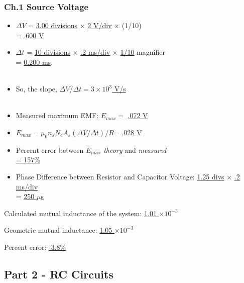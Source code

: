 \documentclass[twocolumn,english]{IEEEtran}
\theoremstyle{plain}
\theoremstyle{plain}
\begin{document}
\subsubsection{Ch.1 Source Voltage}
\begin{itemize}
\item $\Delta V$ = \underline{3.00 divisions}  $\times$ \underline{2 V/div} $\times$ (1/10)
\\ \hfill= \underline{.600 V}

\item $\Delta t$ = \underline{10 divisions} $\times$ \underline{.2 ms/div}  $\times$ \underline{1/10} magnifier \\ \hfill= \underline{0.200 ms}. \\ \\

\item So, the slope, \hfill$\Delta V/\Delta t = $\underline{$3 \times 10^3$ V/s} \\ \\


\noindent\hrulefill

\item Measured maximum EMF: \hfill $E_{max} = $ \underline{.072 V}

\item $E_{max} = \mu_0 n_s N_c A_s (\Delta V / \Delta t)/R $\hfill = \underline{.028 V}

\item Percent error between $E_{max}$ \textit{theory} and \textit{measured} \\ \hfill\underline{= 157\%}

\hrulefill

\item Phase Difference between Resistor and Capacitor Voltage:
\underline{1.25 divs} $\times$ \underline{.2 ms/div} \\ \hfill = \underline{250 $\mu$s}

\end{itemize}

\hrulefill

Calculated mutual inductance of the system: \hfill\underline{1.01 $\times 10^{-3}$}

Geometric mutual inductance: \hfill\underline{1.05 $\times 10^{-3}$}

Percent error: \underline{ -3.8\%}

\hrulefill


\subsection{Part 2 - RC Circuits}
\end{document}
